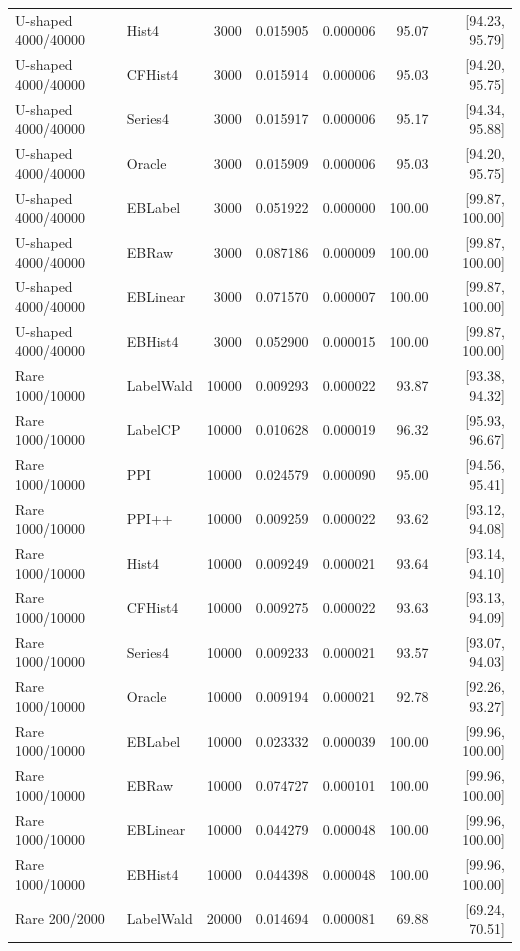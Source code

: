 \begin{longtable}{llrrrrr}
U-shaped 4000/40000 & Hist4 & 3000 & 0.015905 & 0.000006 & 95.07 & [94.23, 95.79]\\
U-shaped 4000/40000 & CFHist4 & 3000 & 0.015914 & 0.000006 & 95.03 & [94.20, 95.75]\\
U-shaped 4000/40000 & Series4 & 3000 & 0.015917 & 0.000006 & 95.17 & [94.34, 95.88]\\
U-shaped 4000/40000 & Oracle & 3000 & 0.015909 & 0.000006 & 95.03 & [94.20, 95.75]\\
U-shaped 4000/40000 & EBLabel & 3000 & 0.051922 & 0.000000 & 100.00 & [99.87, 100.00]\\
U-shaped 4000/40000 & EBRaw & 3000 & 0.087186 & 0.000009 & 100.00 & [99.87, 100.00]\\
U-shaped 4000/40000 & EBLinear & 3000 & 0.071570 & 0.000007 & 100.00 & [99.87, 100.00]\\
U-shaped 4000/40000 & EBHist4 & 3000 & 0.052900 & 0.000015 & 100.00 & [99.87, 100.00]\\
Rare 1000/10000 & LabelWald & 10000 & 0.009293 & 0.000022 & 93.87 & [93.38, 94.32]\\
Rare 1000/10000 & LabelCP & 10000 & 0.010628 & 0.000019 & 96.32 & [95.93, 96.67]\\
Rare 1000/10000 & PPI & 10000 & 0.024579 & 0.000090 & 95.00 & [94.56, 95.41]\\
Rare 1000/10000 & PPI++ & 10000 & 0.009259 & 0.000022 & 93.62 & [93.12, 94.08]\\
Rare 1000/10000 & Hist4 & 10000 & 0.009249 & 0.000021 & 93.64 & [93.14, 94.10]\\
Rare 1000/10000 & CFHist4 & 10000 & 0.009275 & 0.000022 & 93.63 & [93.13, 94.09]\\
Rare 1000/10000 & Series4 & 10000 & 0.009233 & 0.000021 & 93.57 & [93.07, 94.03]\\
Rare 1000/10000 & Oracle & 10000 & 0.009194 & 0.000021 & 92.78 & [92.26, 93.27]\\
Rare 1000/10000 & EBLabel & 10000 & 0.023332 & 0.000039 & 100.00 & [99.96, 100.00]\\
Rare 1000/10000 & EBRaw & 10000 & 0.074727 & 0.000101 & 100.00 & [99.96, 100.00]\\
Rare 1000/10000 & EBLinear & 10000 & 0.044279 & 0.000048 & 100.00 & [99.96, 100.00]\\
Rare 1000/10000 & EBHist4 & 10000 & 0.044398 & 0.000048 & 100.00 & [99.96, 100.00]\\
Rare 200/2000 & LabelWald & 20000 & 0.014694 & 0.000081 & 69.88 & [69.24, 70.51]\\

\end{longtable}
